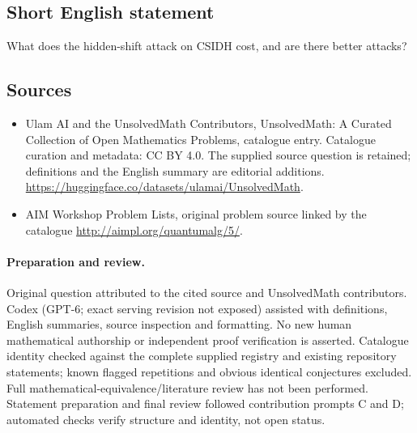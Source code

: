 \documentclass[11pt]{article}
\begin{document}
\subsection{Short English statement}
What does the hidden-shift attack on CSIDH cost, and are there better attacks?
\subsection{Sources}
\begin{itemize}
\item[\hypertarget{source:statement:1}{S1}] Ulam AI and the UnsolvedMath Contributors, UnsolvedMath: A Curated Collection of Open Mathematics Problems, catalogue entry. Catalogue curation and metadata: CC BY 4.0. The supplied source question is retained; definitions and the English summary are editorial additions.
\url{https://huggingface.co/datasets/ulamai/UnsolvedMath}.
\item[\hypertarget{source:statement:2}{S2}] AIM Workshop Problem Lists, original problem source linked by the catalogue
\url{http://aimpl.org/quantumalg/5/}.
\end{itemize}
\paragraph{Preparation and review.}
Original question attributed to the cited source and UnsolvedMath contributors. Codex (GPT-6; exact serving revision not exposed) assisted with definitions, English summaries, source inspection and formatting. No new human mathematical authorship or independent proof verification is asserted. Catalogue identity checked against the complete supplied registry and existing repository statements; known flagged repetitions and obvious identical conjectures excluded. Full mathematical-equivalence/literature review has not been performed. Statement preparation and final review followed contribution prompts C and D; automated checks verify structure and identity, not open status.
\label{end:statement}
\end{document}

